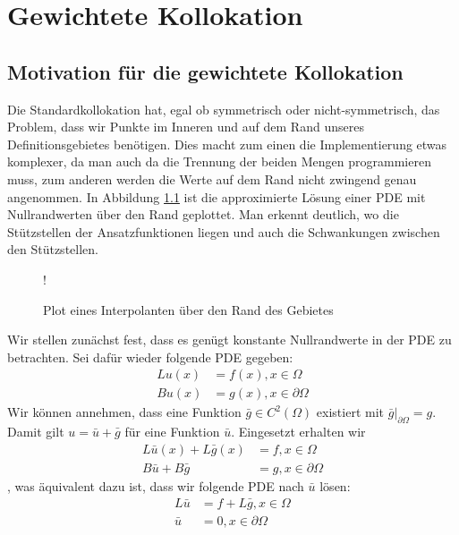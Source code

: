 \chapter{Gewichtete Kollokation}
\label{cha:Gewichtet}
\section{Motivation für die gewichtete Kollokation}
Die Standardkollokation hat, egal ob symmetrisch oder nicht-symmetrisch, das Problem, dass wir Punkte im Inneren und auf dem Rand unseres Definitionsgebietes benötigen. Dies macht zum einen die Implementierung etwas komplexer, da man auch da die Trennung der beiden Mengen programmieren muss, zum anderen werden die Werte auf dem Rand nicht zwingend genau angenommen. In Abbildung \ref{fig:rand} ist die approximierte Lösung einer \ac{PDE} mit Nullrandwerten über den Rand geplottet. Man erkennt deutlich, wo die Stützstellen der Ansatzfunktionen liegen und auch die Schwankungen zwischen den Stützstellen.
\begin{figure}[ht]
\centering
\resizebox {.8\columnwidth} {!} {

}
\caption{Plot eines Interpolanten über den Rand des Gebietes}
\label{fig:rand}
\end{figure}

Wir stellen zunächst fest, dass es genügt konstante Nullrandwerte in der \ac{PDE} zu betrachten. Sei dafür wieder folgende \ac{PDE} gegeben:
\begin{align*}
Lu(x) &= f(x), x\in \Omega\\
Bu(x) &= g(x), x \in \partial \Omega
\end{align*}
Wir können annehmen, dass eine Funktion $\bar{g} \in C^2(\Omega)$ existiert mit $\bar{g}|_{\partial \Omega} = g$. Damit gilt $u = \bar{u} + \bar{g}$ für eine Funktion $\bar{u}$. Eingesetzt erhalten wir
\begin{align*}
L\bar{u}(x) + L\bar{g}(x) &= f , x \in \Omega\\
B\bar{u} + B\bar{g} &= g , x \in \partial \Omega
\end{align*}
, was äquivalent dazu ist, dass wir folgende \ac{PDE} nach $\bar{u}$ lösen:
\begin{align*}
L\bar{u} &= f + L\bar{g}, x \in \Omega\\
\bar{u} &= 0, x \in \partial \Omega
\end{align*}
